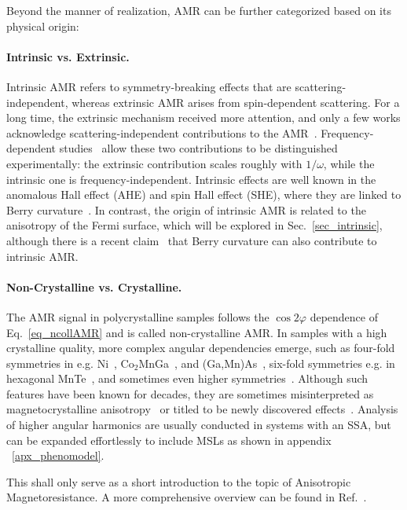 \documentclass[prb,showpacs,amsmath,amssymb,superscriptaddress,twocolumn,floatfix]{revtex4-1}
\begin{document}
Beyond the manner of realization, AMR can be further categorized based on its physical origin:

\paragraph{Intrinsic vs. Extrinsic.} Intrinsic AMR refers to symmetry-breaking effects that are scattering-independent, whereas extrinsic AMR arises from spin-dependent scattering. For a long time, the extrinsic mechanism received more attention, and only a few works acknowledge scattering-independent contributions to the AMR~\cite{Kato:2008, Velev:2005, Zeng:2020, Kato:2007, Nadvordnik:2021, Park:2021}. Frequency-dependent studies~\cite{Nadvordnik:2021, Park:2021} allow these two contributions to be distinguished experimentally: the extrinsic contribution scales roughly with $1/\omega$, while the intrinsic one is frequency-independent. Intrinsic effects are well known in the anomalous Hall effect (AHE) and spin Hall effect (SHE), where they are linked to Berry curvature~\cite{Nagaosa:2010, Zhang:2017}. In contrast, the origin of intrinsic AMR is related to the anisotropy of the Fermi surface, which will be explored in Sec.~\ref{sec_intrinsic}, although there is a recent claim~\cite{Dong:2025_a} that Berry curvature can also contribute to intrinsic AMR.

\paragraph{Non-Crystalline vs. Crystalline.} The AMR signal in polycrystalline samples follows the $\cos 2\varphi$ dependence of Eq.~\ref{eq_ncollAMR} and is called non-crystalline AMR. In samples with a high crystalline quality, more complex angular dependencies emerge, such as four-fold symmetries in e.g. Ni~\cite{Doring:1938}, Co$_2$MnGa~\cite{Sato:2019,Ritzinger:2021}, and (Ga,Mn)As~\cite{DeRanieri:2008}, six-fold symmetries e.g. in hexagonal MnTe~\cite{Kriegner:2017, Gonzalez-Betancourt:2024}, and sometimes even higher symmetries~\cite{Gonzalez-Betancourt:2024, NamHai:2012}. Although such features have been known for decades, they are sometimes misinterpreted as magnetocrystalline anisotropy~\cite{Ritzinger:2023} or titled to be newly discovered effects~\cite{Dong:2023}. Analysis of higher angular harmonics are usually conducted in systems with an SSA, but can be expanded effortlessly to include MSLs as shown in appendix ~\ref{apx_phenomodel}.

This shall only serve as a short introduction to the topic of Anisotropic Magnetoresistance. A more comprehensive overview can be found in Ref.~\cite{Ritzinger:2023}.
\end{document}
